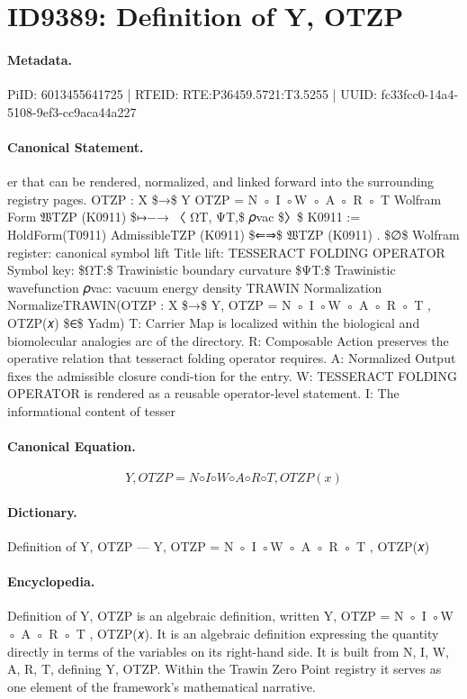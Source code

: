 \section*{ID9389: Definition of Y, OTZP}
\paragraph{Metadata.}
PiID: 6013455641725 | RTEID: RTE:P36459.5721:T3.5255 | UUID: fc33fcc0-14a4-5108-9ef3-cc9aca44a227

\paragraph{Canonical Statement.}
er that can be rendered, normalized, and linked forward into the surrounding registry pages. OTZP : X \$→\$ Y OTZP = N ◦ I ◦W ◦ A ◦ R ◦ T Wolfram Form 𝔚TZP (K0911) \$↦−→ 〈 ΩT, ΨT,\$ 𝜌vac \$〉\$ K0911 := HoldForm(T0911) AdmissibleTZP (K0911) \$⇐⇒\$ 𝔚TZP (K0911) . \$∅\$ Wolfram register: canonical symbol lift Title lift: TESSERACT FOLDING OPERATOR Symbol key: \$ΩT:\$ Trawinistic boundary curvature \$ΨT:\$ Trawinistic wavefunction 𝜌vac: vacuum energy density TRAWIN Normalization NormalizeTRAWIN(OTZP : X \$→\$ Y, OTZP = N ◦ I ◦W ◦ A ◦ R ◦ T , OTZP(𝑥) \$∈\$ Yadm) T: Carrier Map is localized within the biological and biomolecular analogies arc of the directory. R: Composable Action preserves the operative relation that tesseract folding operator requires. A: Normalized Output fixes the admissible closure condi-tion for the entry. W: TESSERACT FOLDING OPERATOR is rendered as a reusable operator-level statement. I: The informational content of tesser

\paragraph{Canonical Equation.}
\[
Y, OTZP = N ◦ I ◦W ◦ A ◦ R ◦ T , OTZP(𝑥)
\]

\paragraph{Dictionary.}
Definition of Y, OTZP — Y, OTZP = N ◦ I ◦W ◦ A ◦ R ◦ T , OTZP(𝑥)

\paragraph{Encyclopedia.}
Definition of Y, OTZP is an algebraic definition, written Y, OTZP = N ◦ I ◦W ◦ A ◦ R ◦ T , OTZP(𝑥). It is an algebraic definition expressing the quantity directly in terms of the variables on its right-hand side. It is built from N, I, W, A, R, T, defining Y, OTZP. Within the Trawin Zero Point registry it serves as one element of the framework's mathematical narrative.
